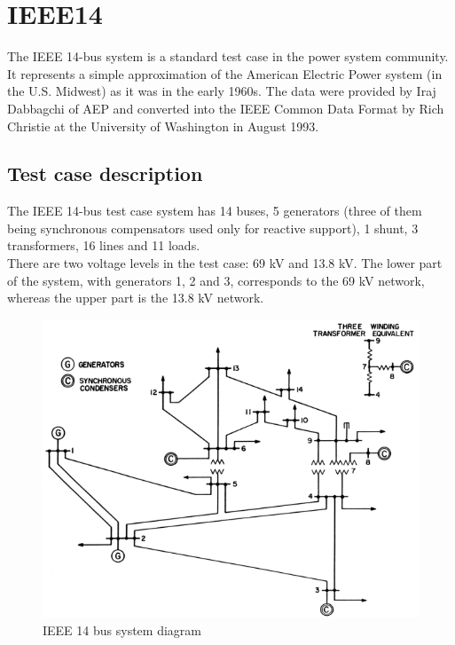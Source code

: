 \documentclass[a4paper, 12pt]{report}
\begin{document}
\chapter{IEEE14}

The IEEE 14-bus system is a standard test case in the power system community. It represents a simple approximation of the American Electric Power system (in the U.S. Midwest) as it was in the early 1960s. The data were provided by Iraj Dabbagchi of AEP and converted into the IEEE Common Data Format by Rich Christie at the University of Washington in August 1993.

\section{Test case description}

The IEEE 14-bus test case system has 14 buses, 5 generators (three of them being synchronous compensators used only for reactive support), 1 shunt, 3 transformers, 16 lines and 11 loads.\\
There are two voltage levels in the test case: 69 kV and 13.8 kV. The lower part of the system, with generators 1, 2 and 3, corresponds to the 69 kV network, whereas the upper part is the 13.8 kV network.

\begin{figure}[H]
  \includegraphics[width=\textwidth]{Single-line-diagram-of-IEEE-14-bus-system.png}
  \caption{IEEE 14 bus system diagram}
\end{figure}
\end{document}
